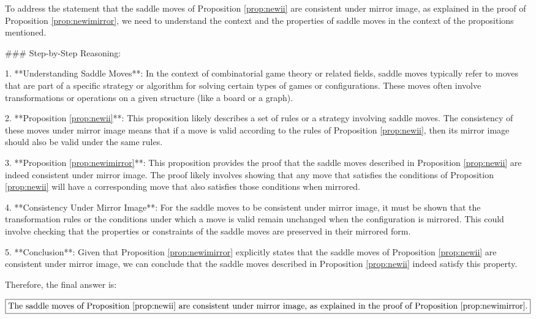 To address the statement that the saddle moves of Proposition \ref{prop:newii} are consistent under mirror image, as explained in the proof of Proposition \ref{prop:newimirror}, we need to understand the context and the properties of saddle moves in the context of the propositions mentioned.

### Step-by-Step Reasoning:

1. **Understanding Saddle Moves**: In the context of combinatorial game theory or related fields, saddle moves typically refer to moves that are part of a specific strategy or algorithm for solving certain types of games or configurations. These moves often involve transformations or operations on a given structure (like a board or a graph).

2. **Proposition \ref{prop:newii}**: This proposition likely describes a set of rules or a strategy involving saddle moves. The consistency of these moves under mirror image means that if a move is valid according to the rules of Proposition \ref{prop:newii}, then its mirror image should also be valid under the same rules.

3. **Proposition \ref{prop:newimirror}**: This proposition provides the proof that the saddle moves described in Proposition \ref{prop:newii} are indeed consistent under mirror image. The proof likely involves showing that any move that satisfies the conditions of Proposition \ref{prop:newii} will have a corresponding move that also satisfies those conditions when mirrored.

4. **Consistency Under Mirror Image**: For the saddle moves to be consistent under mirror image, it must be shown that the transformation rules or the conditions under which a move is valid remain unchanged when the configuration is mirrored. This could involve checking that the properties or constraints of the saddle moves are preserved in their mirrored form.

5. **Conclusion**: Given that Proposition \ref{prop:newimirror} explicitly states that the saddle moves of Proposition \ref{prop:newii} are consistent under mirror image, we can conclude that the saddle moves described in Proposition \ref{prop:newii} indeed satisfy this property.

Therefore, the final answer is:

\[
\boxed{\text{The saddle moves of Proposition \ref{prop:newii} are consistent under mirror image, as explained in the proof of Proposition \ref{prop:newimirror}.}}
\]